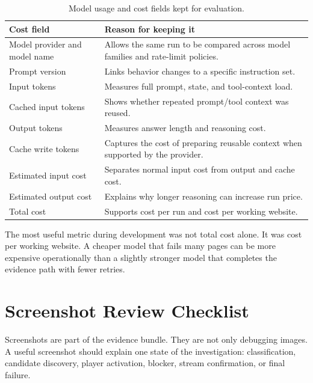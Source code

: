 \begin{table}[!htbp]
\centering
\begin{tabularx}{\textwidth}{Q{4.0cm}Y}
\toprule
{}
Cost field & Reason for keeping it \\
\midrule
Model provider and model name & Allows the same run to be compared across model
families and rate-limit policies. \\
Prompt version & Links behavior changes to a specific instruction set. \\
Input tokens & Measures full prompt, state, and tool-context load. \\
Cached input tokens & Shows whether repeated prompt/tool context was reused. \\
Output tokens & Measures answer length and reasoning cost. \\
Cache write tokens & Captures the cost of preparing reusable context when
supported by the provider. \\
Estimated input cost & Separates normal input cost from output and cache cost. \\
Estimated output cost & Explains why longer reasoning can increase run price. \\
Total cost & Supports cost per run and cost per working website. \\
\bottomrule
\end{tabularx}
\caption{Model usage and cost fields kept for evaluation.}
\label{tab:runtime-cost-fields}
\end{table}

The most useful metric during development was not total cost alone. It was cost
per working website. A cheaper model that fails many pages can be more expensive
operationally than a slightly stronger model that completes the evidence path
with fewer retries.

\section{Screenshot Review Checklist}

Screenshots are part of the evidence bundle. They are not only debugging
images. A useful screenshot should explain one state of the investigation:
classification, candidate discovery, player activation, blocker, stream
confirmation, or final failure.

